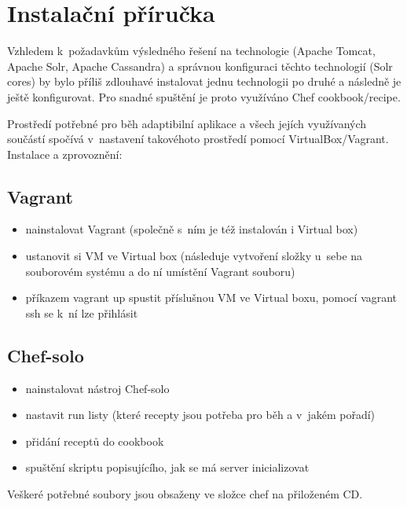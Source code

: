 \documentclass[thesis=M,czech]{FITthesis}[2014/05/07]
\begin{document}
\chapter{Instalační příručka}
Vzhledem k~požadavkům výsledného řešení na technologie (Apache Tomcat, Apache Solr, Apache Cassandra) a správnou konfiguraci těchto technologií (Solr cores) by bylo příliš zdlouhavé instalovat jednu technologii po druhé a následně je ještě konfigurovat. Pro snadné spuštění je proto využíváno Chef cookbook/recipe.

Prostředí potřebné pro běh adaptibilní aplikace a všech jejích využívaných součástí spočívá v~nastavení takovéhoto prostředí pomocí VirtualBox/Vagrant. Instalace a zprovoznění:

\section{Vagrant}
\begin{itemize}
	\item nainstalovat Vagrant (společně s~ním je též instalován i Virtual box)
	\item ustanovit si VM ve Virtual box (následuje vytvoření složky u~sebe na souborovém systému a do ní umístění Vagrant souboru)
	\item příkazem vagrant up spustit příslušnou VM ve Virtual boxu, pomocí vagrant ssh se k~ní lze přihlásit	
\end{itemize}

\section{Chef-solo}
\begin{itemize}
	\item nainstalovat nástroj Chef-solo
	\item nastavit run listy (které recepty jsou potřeba pro běh a v~jakém pořadí)	
	\item přidání receptů do cookbook	
	\item spuštění skriptu popisujícího, jak se má server inicializovat
\end{itemize}

Veškeré potřebné soubory jsou obsaženy ve složce chef na přiloženém CD.
\end{document}
